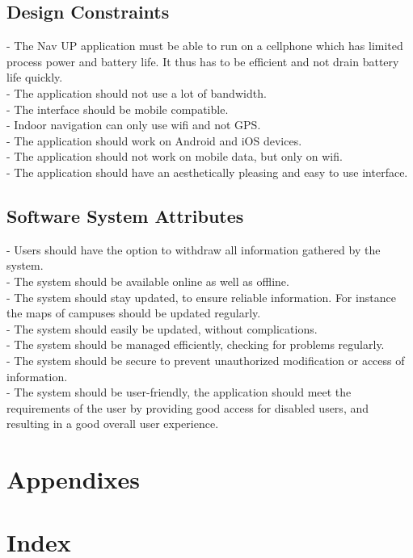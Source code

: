 \documentclass[12pt]{article}
\begin{document}
	\subsection{Design Constraints}
	- The Nav UP application must be able to run on a cellphone which has limited process power and battery life. It thus has to be efficient and not drain battery life quickly. \\
	- The application should not use a lot of bandwidth.\\
	- The interface should be mobile compatible.\\
	- Indoor navigation can only use wifi and not GPS. \\
	- The application should work on Android and iOS devices. \\
	- The application should not work on mobile data, but only on wifi. \\
	- The application should have an aesthetically pleasing and easy to use interface. 
	\subsection{Software System Attributes}
	- Users should have the option to withdraw all information gathered by the system.\\
	- The system should be available online as well as offline.\\
	- The system should stay updated, to ensure reliable information. For instance the maps of campuses should be updated regularly. \\
	- The system should easily be updated, without complications. \\
	- The system should be managed efficiently, checking for problems regularly. \\
	- The system should be secure to prevent unauthorized modification or access of information. \\
	- The system should be user-friendly, the application should meet the requirements of the user by providing good access for disabled users, and resulting in a good overall user experience.
	\section{Appendixes}
	\section{Index}
\end{document}
